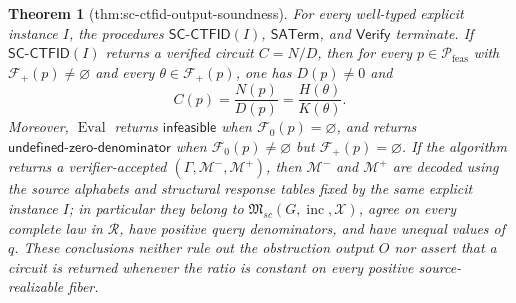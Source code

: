 \documentclass{article}
\newtheorem{theorem}{Theorem}
\begin{document}
\begin{theorem}[thm:sc-ctfid-output-soundness]\label{thm:sc-ctfid-output-soundness}
For every well-typed explicit instance \(I\), the procedures \(\mathsf{SC\mbox{-}CTFID}(I)\), \(\mathsf{SATerm}\), and \(\mathsf{Verify}\) terminate.  If \(\mathsf{SC\mbox{-}CTFID}(I)\) returns a verified circuit \(C=N/D\), then for every \(p\in\mathcal P_{\mathrm{feas}}\) with \(\mathcal F_+(p)\ne\varnothing\) and every \(\theta\in\mathcal F_+(p)\), one has \(D(p)\ne0\) and
\[
C(p)=\frac{N(p)}{D(p)}=\frac{H(\theta)}{K(\theta)}.
\]
Moreover, \(\operatorname{Eval}\) returns \(\mathsf{infeasible}\) when \(\mathcal F_0(p)=\varnothing\), and returns \(\mathsf{undefined\mbox{-}zero\mbox{-}denominator}\) when \(\mathcal F_0(p)\ne\varnothing\) but \(\mathcal F_+(p)=\varnothing\).  If the algorithm returns a verifier-accepted \((\Gamma,\mathcal M^-,\mathcal M^+)\), then \(\mathcal M^-\) and \(\mathcal M^+\) are decoded using the source alphabets and structural response tables fixed by the same explicit instance \(I\); in particular they belong to \(\mathfrak M_{sc}(G,\operatorname{inc},\mathcal X)\), agree on every complete law in \(\mathcal R\), have positive query denominators, and have unequal values of \(q\).  These conclusions neither rule out the obstruction output \(O\) nor assert that a circuit is returned whenever the ratio is constant on every positive source-realizable fiber.
\end{theorem}
\end{document}

